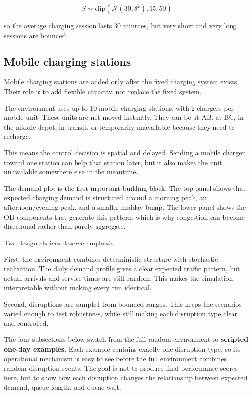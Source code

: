 \documentclass[11pt]{article}
\begin{document}
\[
S \sim \mathrm{clip}\left(\mathcal{N}(30, 8^2), 15, 50\right)
\]

so the average charging session lasts 30 minutes, but very short and
very long sessions are bounded.

    \subsection{Mobile charging
stations}\label{mobile-charging-stations}

Mobile charging stations are added only after the fixed charging system
exists. Their role is to add flexible capacity, not replace the fixed
system.

The environment uses up to 10 mobile charging stations, with 2 chargers
per mobile unit. These units are not moved instantly. They can be at AB,
at BC, in the middle depot, in transit, or temporarily unavailable
because they need to recharge.

This means the control decision is spatial and delayed. Sending a mobile
charger toward one station can help that station later, but it also
makes the unit unavailable somewhere else in the meantime.

    The demand plot is the first important building block. The top panel
shows that expected charging demand is structured around a morning peak,
an afternoon/evening peak, and a smaller midday bump. The lower panel
shows the OD components that generate this pattern, which is why
congestion can become directional rather than purely aggregate.

    Two design choices deserve emphasis.

First, the environment combines deterministic structure with stochastic
realization. The daily demand profile gives a clear expected traffic
pattern, but actual arrivals and service times are still random. This
makes the simulation interpretable without making every run identical.

Second, disruptions are sampled from bounded ranges. This keeps the
scenarios varied enough to test robustness, while still making each
disruption type clear and controlled.

The four subsections below switch from the full random environment to
\textbf{scripted one-day examples}. Each example contains exactly one
disruption type, so its operational mechanism is easy to see before the
full environment combines random disruption events. The goal is not to
produce final performance scores here, but to show how each disruption
changes the relationship between expected demand, queue length, and
queue wait.
\end{document}
